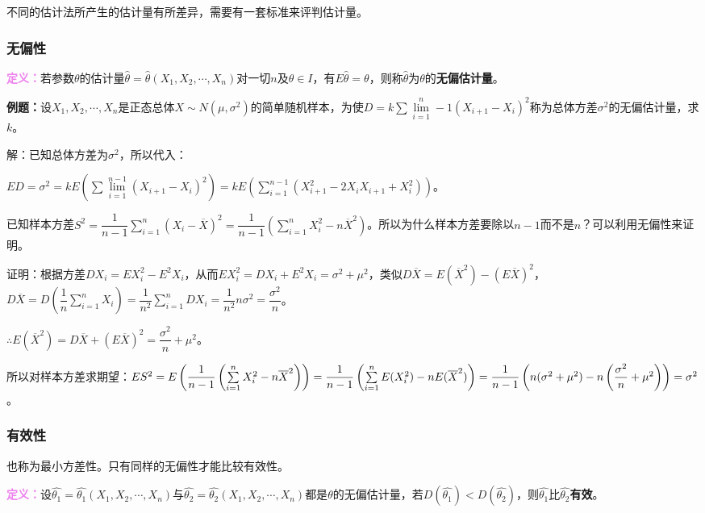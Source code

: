 \documentclass[UTF8, 12pt]{ctexart}
\begin{document}
不同的估计法所产生的估计量有所差异，需要有一套标准来评判估计量。

\subsubsection{无偏性}

\textcolor{violet}{\textbf{定义：}}若参数$\theta$的估计量$\hat{\theta}=\hat{\theta}(X_1,X_2,\cdots,X_n)$对一切$n$及$\theta\in I$，有$E\hat{\theta}=\theta$，则称$\hat{\theta}$为$\theta$的\textbf{无偏估计量}。

\textbf{例题：}设$X_1,X_2,\cdots,X_n$是正态总体$X\sim N(\mu,\sigma^2)$的简单随机样本，为使$D=k\sum\lim\limits_{i=1}^n-1(X_{i+1}-X_i)^2$称为总体方差$\sigma^2$的无偏估计量，求$k$。

解：已知总体方差为$\sigma^2$，所以代入：

$ED=\sigma^2=kE(\sum\lim\limits_{i=1}^{n-1}(X_{i+1}-X_i)^2)=kE(\sum\limits_{i=1}^{n-1}(X_{i+1}^2-2X_iX_{i+1}+X_i^2))$。

已知样本方差$S^2=\dfrac{1}{n-1}\sum\limits_{i=1}^n(X_i-\overline{X})^2=\dfrac{1}{n-1}\left(\sum\limits_{i=1}^nX_i^2-n\overline{X}^2\right)$。所以为什么样本方差要除以$n-1$而不是$n$？可以利用无偏性来证明。

证明：根据方差$DX_i=EX_i^2-E^2X_i$，从而$EX_i^2=DX_i+E^2X_i=\sigma^2+\mu^2$，类似$D\overline{X}=E(\overline{X}^2)-(E\overline{X})^2$，$D\overline{X}=D\left(\dfrac{1}{n}\sum\limits_{i=1}^nX_i\right)=\dfrac{1}{n^2}\sum\limits_{i=1}^nDX_i=\dfrac{1}{n^2}n\sigma^2=\dfrac{\sigma^2}{n}$。

$\therefore E(\overline{X}^2)=D\overline{X}+(E\overline{X})^2=\dfrac{\sigma^2}{n}+\mu^2$。

所以对样本方差求期望：$ES^2=E\left(\dfrac{1}{n-1}\left(\sum\limits_{i=1}^nX_i^2-n\overline{X}^2\right)\right)=\dfrac{1}{n-1}\\\left(\sum\limits_{i=1}^nE(X_i^2)-nE(\overline{X}^2)\right)=\dfrac{1}{n-1}\left(n(\sigma^2+\mu^2)-n\left(\dfrac{\sigma^2}{n}+\mu^2\right)\right)=\sigma^2$。

\subsubsection{有效性}

也称为最小方差性。只有同样的无偏性才能比较有效性。

\textcolor{violet}{\textbf{定义：}}设$\hat{\theta_1}=\hat{\theta_1}(X_1,X_2,\cdots,X_n)$与$\hat{\theta_2}=\hat{\theta_2}(X_1,X_2,\cdots,X_n)$都是$\theta$的无偏估计量，若$D(\hat{\theta_1})<D(\hat{\theta_2})$，则$\hat{\theta_1}$比$\hat{\theta_2}$\textbf{有效}。
\end{document}
